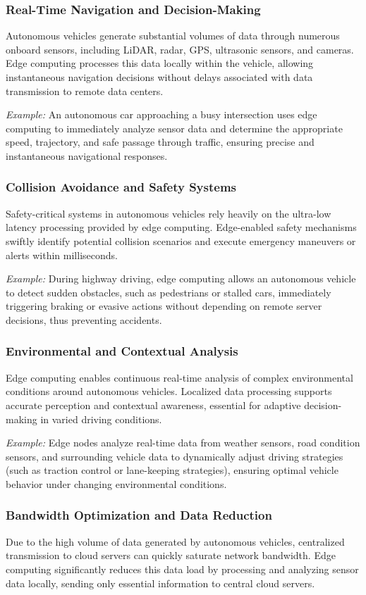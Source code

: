 \documentclass[runningheads]{llncs}
\begin{document}
\subsubsection{Real-Time Navigation and Decision-Making}
Autonomous vehicles generate substantial volumes of data through numerous onboard sensors, including LiDAR, radar, GPS, ultrasonic sensors, and cameras. Edge computing processes this data locally within the vehicle, allowing instantaneous navigation decisions without delays associated with data transmission to remote data centers.

\textit{Example:} An autonomous car approaching a busy intersection uses edge computing to immediately analyze sensor data and determine the appropriate speed, trajectory, and safe passage through traffic, ensuring precise and instantaneous navigational responses.

\subsubsection{Collision Avoidance and Safety Systems}
Safety-critical systems in autonomous vehicles rely heavily on the ultra-low latency processing provided by edge computing. Edge-enabled safety mechanisms swiftly identify potential collision scenarios and execute emergency maneuvers or alerts within milliseconds.

\textit{Example:} During highway driving, edge computing allows an autonomous vehicle to detect sudden obstacles, such as pedestrians or stalled cars, immediately triggering braking or evasive actions without depending on remote server decisions, thus preventing accidents.

\subsubsection{Environmental and Contextual Analysis}
Edge computing enables continuous real-time analysis of complex environmental conditions around autonomous vehicles. Localized data processing supports accurate perception and contextual awareness, essential for adaptive decision-making in varied driving conditions.

\textit{Example:} Edge nodes analyze real-time data from weather sensors, road condition sensors, and surrounding vehicle data to dynamically adjust driving strategies (such as traction control or lane-keeping strategies), ensuring optimal vehicle behavior under changing environmental conditions.

\subsubsection{Bandwidth Optimization and Data Reduction}
Due to the high volume of data generated by autonomous vehicles, centralized transmission to cloud servers can quickly saturate network bandwidth. Edge computing significantly reduces this data load by processing and analyzing sensor data locally, sending only essential information to central cloud servers.
\end{document}
